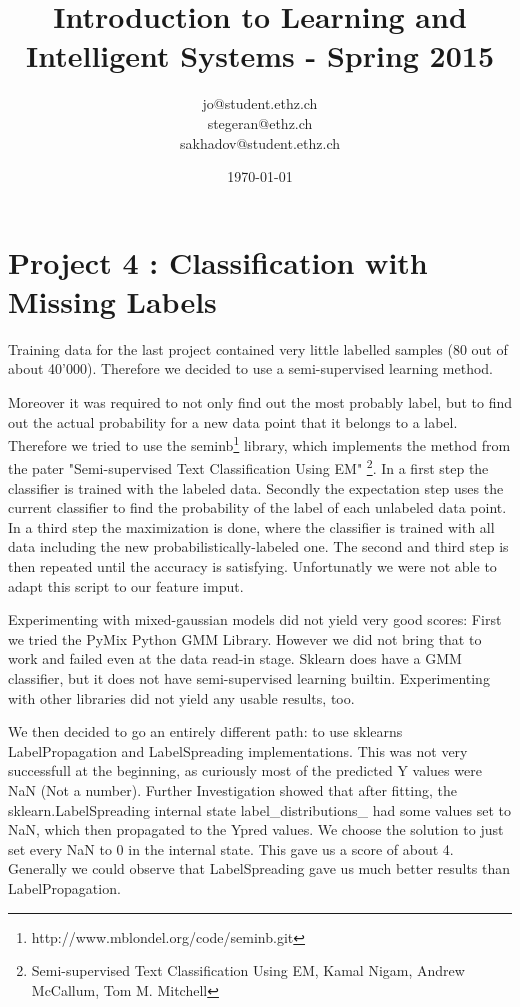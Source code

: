 \documentclass[a4paper, 11pt]{article}
\title{Introduction to Learning and Intelligent Systems - Spring 2015}
\author{jo@student.ethz.ch\\ stegeran@ethz.ch\\sakhadov@student.ethz.ch}
\date{\today}
\begin{document}
\maketitle

\section*{Project 4 : Classification with Missing Labels}

Training data for the last project contained very little labelled samples (80 out of about 40'000). Therefore we decided to use a semi-supervised learning method.

Moreover it was required to not only find out the most probably label, but to find out the actual probability for a new data point that it belongs to a label. Therefore we tried to use the seminb\footnote{http://www.mblondel.org/code/seminb.git} library, which implements the method from the pater "Semi-supervised Text Classification Using EM" \footnote{Semi-supervised Text Classification Using EM, Kamal Nigam, Andrew McCallum, Tom M. Mitchell }. In a first step the classifier is trained with the labeled data. Secondly the expectation step uses the current classifier to find the probability of the label of each unlabeled data point. In a third step the maximization is done, where the classifier is trained with all data including the new probabilistically-labeled one. The second and third step is then repeated until the accuracy is satisfying.
Unfortunatly we were not able to adapt this script to our feature imput.

Experimenting with mixed-gaussian models did not yield very good scores: First we tried the PyMix Python GMM Library. However we did not bring that to work and failed even at the data read-in stage. Sklearn does have a GMM classifier, but it does not have semi-supervised learning builtin. Experimenting with other libraries did not yield any usable results, too.

We then decided to go an entirely different path: to use sklearns LabelPropagation and LabelSpreading implementations. This was not very successfull at the beginning, as curiously most of the predicted Y values were NaN (Not a number). Further Investigation showed that after fitting, the sklearn.LabelSpreading internal state label\_distributions\_ had some values set to NaN, which then propagated to the Ypred values. We choose the solution to just set every NaN to 0 in the internal state. This gave us a score of about 4. Generally we could observe that LabelSpreading gave us much better results than LabelPropagation.
\end{document}
